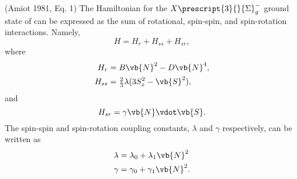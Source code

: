 \documentclass[11pt, twoside, fleqn]{report}
\newcommand{\state}[2]{\prescript{#1}{}{#2}}
\begin{document}
(Amiot 1981, Eq. 1)
The Hamiltonian for the $X\state{3}{\Sigma}_{g}^{-}$ ground state of  can be expressed as the sum of rotational, spin-spin, and spin-rotation interactions. Namely,
\begin{equation*}
    H = H_{r} + H_{ss} + H_{sr},
\end{equation*}
where
\begin{align*}
    H_{r}  & = B\vb{N}^{2} - D\vb{N}^{4},                    \\
    H_{ss} & = \tfrac{2}{3}\lambda(3S_{z}^{2} - \vb{S}^{2}),
\end{align*}
and
\begin{equation*}
    H_{sr} = \gamma\vb{N}\vdot\vb{S}.
\end{equation*}
The spin-spin and spin-rotation coupling constants, $\lambda$ and $\gamma$ respectively, can be written as
\begin{align*}
    \lambda & = \lambda_{0} + \lambda_{1}\vb{N}^{2} \\
    \gamma  & = \gamma_{0} + \gamma_{1}\vb{N}^{2}.
\end{align*}
\end{document}
